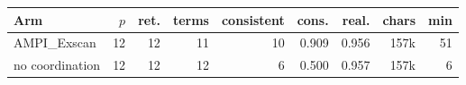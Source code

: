 \begin{tabular}{@{}lrrrrrrrr@{}}
\toprule
\textbf{Arm} & \textbf{$p$} & \textbf{ret.} & \textbf{terms} & \textbf{consistent} & \textbf{cons.} & \textbf{real.} & \textbf{chars} & \textbf{min} \\
\midrule
AMPI_Exscan & 12 & 12 & 11 & 10 & 0.909 & 0.956 & 157k & 51 \\
no coordination & 12 & 12 & 12 & 6 & 0.500 & 0.957 & 157k & 6 \\
\bottomrule
\end{tabular}
